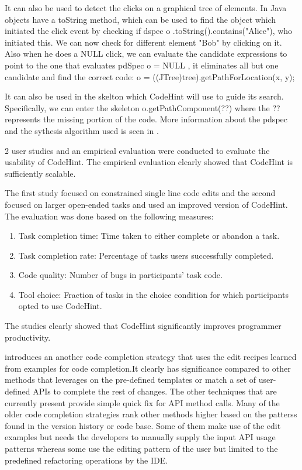 \documentclass[10pt, conference, compsocconf]{IEEEtran}
\begin{document}
It can also be used to detect the clicks on a graphical tree of elements. In Java objects have a toString method, which can be used to find the object which initiated the click event by checking if dspec o .toString().contains("Alice"), who initiated this. We can now check for different element "Bob" by clicking on it. Also when he does a NULL click, we can evaluate the candidate expressions to point to the one that evaluates pdSpec o = NULL , it eliminates all but one candidate and find the correct code: 
o = ((JTree)tree).getPathForLocation(x, y);

It can also be used in the skelton which CodeHint will use to guide its search. Specifically, we can enter the skeleton o.getPathComponent(??) where the ??represents the missing portion of the code.
More information about the pdspec and the sythesis algorithm used is seen in \cite{galenson2014codehint}.


2 user studies and an empirical evaluation were conducted to evaluate the usability of CodeHint. 
The empirical evaluation clearly showed that CodeHint is sufficiently scalable.

The first study focused on constrained single line code edits and the second focused on larger open-ended tasks and used an improved version of CodeHint.
The evaluation was done based on the following measures:
\begin{enumerate}
\item Task completion time: Time taken to either complete or abandon a task.
\item Task completion rate: Percentage of tasks users successfully completed.
\item Code quality: Number of bugs in participants’ task code.
\item Tool choice: Fraction of tasks in the choice condition for which participants opted to use CodeHint.
\end{enumerate}

The studies clearly showed that CodeHint significantly improves programmer productivity.



\cite{jacobellis2014cookbook} introduces an another code completion strategy that uses the edit recipes learned from examples for code completion.It clearly has significance compared to other methods that leverages on the pre-defined templates or match a set of user-defined APIs to complete the
rest of changes. The other techniques that are currently present provide simple quick fix for API  method calls. Many of the older code completion strategies rank other methods higher based on the patterss found in the version history or code base\cite{bruch2009learning}. Some of them make use of the edit examples but needs the developers to manually supply the input API usage patterns\cite{nguyen2012graph} whereas some use the editing pattern of the user\cite{foster2012witchdoctor} but limited to the predefined refactoring operations by the IDE. 
 
\end{document}
